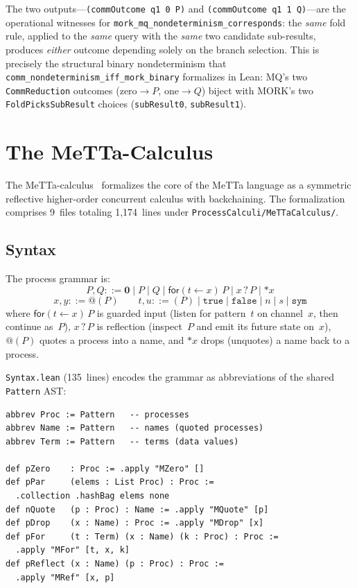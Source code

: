 \documentclass[11pt]{article}
\theoremstyle{definition}
\theoremstyle{remark}
\begin{document}
\noindent
The two outputs---\texttt{(commOutcome q1 0 P)} and
\texttt{(commOutcome q1 1 Q)}---are the operational witnesses for
\texttt{mork\_mq\_nondeterminism\_corresponds}: the \emph{same}
fold rule, applied to the \emph{same} query with the \emph{same}
two candidate sub-results, produces \emph{either} outcome depending
solely on the branch selection.  This is precisely the structural
binary nondeterminism that \texttt{comm\_nondeterminism\_iff\_mork\_binary}
formalizes in Lean: MQ's two \texttt{CommReduction} outcomes (zero$\to P$,
one$\to Q$) biject with MORK's two \texttt{FoldPicksSubResult} choices
(\texttt{subResult0}, \texttt{subResult1}).


\section{The MeTTa-Calculus}
\label{sec:metta-calc}

The MeTTa-calculus~\cite{MeredithMeTTaCalculus2024} formalizes the core
of the MeTTa language as a symmetric reflective higher-order concurrent
calculus with backchaining.  The formalization comprises 9~files
totaling 1{,}174~lines under \texttt{ProcessCalculi/MeTTaCalculus/}.

\subsection{Syntax}

The process grammar is:
\[
  P,Q ::= \mathbf{0} \mid P \mathbin{|} Q \mid
           \mathsf{for}(t \leftarrow x)\, P \mid x\mathbin{?}P
           \mid {*}x
\]
\[
  x,y ::= @(P) \qquad
  t,u ::= (P) \mid \mathtt{true} \mid \mathtt{false} \mid n \mid s \mid \mathtt{sym}
\]
where $\mathsf{for}(t \leftarrow x)\, P$ is guarded input (listen for
pattern~$t$ on channel~$x$, then continue as~$P$), $x\mathbin{?}P$ is
reflection (inspect~$P$ and emit its future state on~$x$), $@(P)$
quotes a process into a name, and ${*}x$ drops (unquotes) a name back
to a process.

\texttt{Syntax.lean} (135~lines) encodes the grammar as abbreviations of
the shared \texttt{Pattern} AST:

\begin{lstlisting}[caption={MeTTa-calculus syntax (from \texttt{Syntax.lean})}]
abbrev Proc := Pattern   -- processes
abbrev Name := Pattern   -- names (quoted processes)
abbrev Term := Pattern   -- terms (data values)

def pZero    : Proc := .apply "MZero" []
def pPar     (elems : List Proc) : Proc :=
  .collection .hashBag elems none
def nQuote   (p : Proc) : Name := .apply "MQuote" [p]
def pDrop    (x : Name) : Proc := .apply "MDrop" [x]
def pFor     (t : Term) (x : Name) (k : Proc) : Proc :=
  .apply "MFor" [t, x, k]
def pReflect (x : Name) (p : Proc) : Proc :=
  .apply "MRef" [x, p]
\end{lstlisting}
\end{document}

